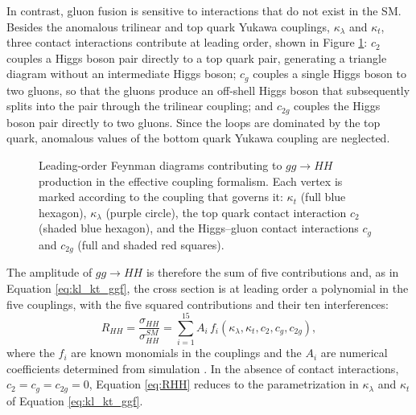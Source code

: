 In contrast, gluon fusion is sensitive to interactions that do not exist in the SM. Besides the anomalous trilinear and top quark Yukawa couplings, $\kappa_\lambda$ and $\kappa_t$, three contact interactions contribute at leading order, shown in Figure \ref{fig:BSM_diagrams}: $c_2$ couples a Higgs boson pair directly to a top quark pair, generating a triangle diagram without an intermediate Higgs boson; $c_g$ couples a single Higgs boson to two gluons, so that the gluons produce an off-shell Higgs boson that subsequently splits into the pair through the trilinear coupling; and $c_{2g}$ couples the Higgs boson pair directly to two gluons. Since the loops are dominated by the top quark, anomalous values of the bottom quark Yukawa coupling are neglected.
%
%
\begin{figure}
    \centering
    
    \caption{Leading-order Feynman diagrams contributing to $gg\to HH$ production in the effective coupling formalism. Each vertex is marked according to the coupling that governs it: $\kappa_t$ (full blue hexagon), $\kappa_\lambda$ (purple circle), the top quark contact interaction $c_2$ (shaded blue hexagon), and the Higgs–gluon contact interactions $c_g$ and $c_{2g}$ (full and shaded red squares).}
    \label{fig:BSM_diagrams}
\end{figure}

The amplitude of $gg\to HH$ is therefore the sum of five contributions and, as in Equation \ref{eq:kl_kt_ggf}, the cross section is at leading order a polynomial in the five couplings, with the five squared contributions and their ten interferences:
%
\begin{equation}
    R_{HH} = \frac{\sigma_{HH}}{\sigma_{HH}^{SM}} = \sum_{i=1}^{15} A_i\, f_i(\kappa_\lambda,\kappa_t,c_2,c_g,c_{2g}),
    \label{eq:RHH}
\end{equation}
where the $f_i$ are known monomials in the couplings and the $A_i$ are numerical coefficients determined from simulation \cite{Carvalho:2016rys}. In the absence of contact interactions, $c_2=c_g=c_{2g}=0$, Equation \ref{eq:RHH} reduces to the parametrization in $\kappa_\lambda$ and $\kappa_t$ of Equation \ref{eq:kl_kt_ggf}.

